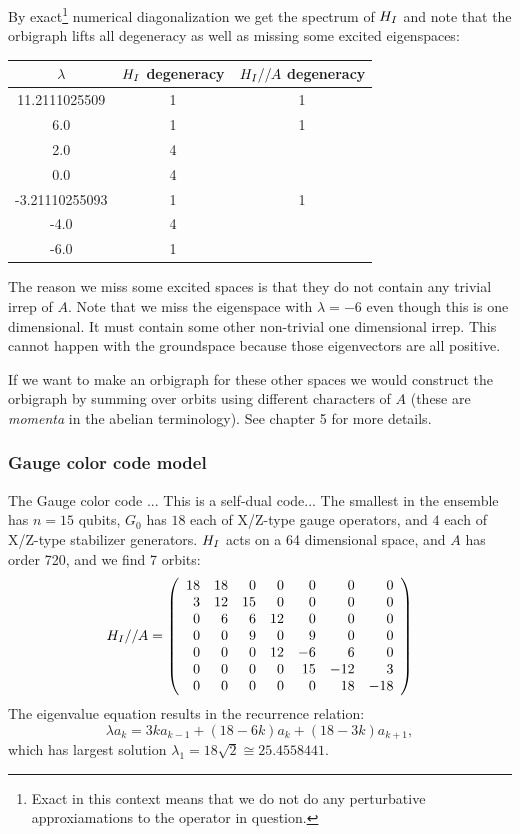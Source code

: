 \documentclass[12pt]{article}
\begin{document}
By exact\footnote{Exact in this context means that we do not do any
perturbative approxiamations to the operator in question.}
numerical diagonalization
we get the spectrum of $H_I$ and note that the orbigraph lifts
all degeneracy as well as missing some excited eigenspaces:
\begin{center}
\begin{tabular}{ c|c|c } 
$\lambda$ & $H_I$ degeneracy & $H_I//A$ degeneracy \\
\hline
    11.2111025509 & 1 & 1 \\
    6.0 & 1 & 1 \\
    2.0 & 4 &   \\
    0.0 & 4 &   \\
    -3.21110255093 & 1 & 1 \\
    -4.0 & 4 &   \\
    -6.0 & 1 &   
\end{tabular}
\end{center}
The reason we miss some excited spaces is that they do not contain
any trivial irrep of $A.$
Note that we miss the eigenspace with $\lambda = -6$
even though this is one dimensional. It must contain some other non-trivial
one dimensional irrep. This cannot happen with the groundspace because
those eigenvectors are all positive.

If we want to make an orbigraph for these other spaces we would construct
the orbigraph by
summing over orbits using different characters of $A$
(these are \emph{momenta} in the abelian terminology).
See \cite{Cvetkovic1980} chapter 5 for more details.

%
\subsubsection{Gauge color code model}
The Gauge color code \cite{Bombin2015,Bombin2015single}...
This is a self-dual code...
The smallest in the ensemble has $n=15$ qubits,
$G_0$ has $18$ each of X/Z-type gauge operators,
and $4$ each of X/Z-type stabilizer generators.
$H_I$ acts on a 64 dimensional space, and $A$ has
order 720, and we find 7 orbits:
$$
H_I//A = 
\left(\begin{array}{rrrrrrr}
18 & 18 &  0 &  0 &  0 &  0 &  0 \cr
  3 & 12 & 15 &  0 &  0 &  0 &  0 \cr
  0 &  6 &  6 & 12 &  0 &  0 &  0 \cr
  0 &  0 &  9 &  0 &  9 &  0 &  0 \cr
  0 &  0 &  0 & 12 & -6 &  6 &  0 \cr
  0 &  0 &  0 &  0 & 15 & -12 &  3 \cr
  0 &  0 &  0 &  0 &  0 & 18 & -18
\end{array}\right)
$$
The eigenvalue equation results in
the recurrence relation:
$$
    \lambda a_k = 3ka_{k-1} + (18-6k)a_k + (18-3k)a_{k+1},
$$
which has largest solution 
$\lambda_1 = 18\sqrt{2} \cong 25.4558441.$
\end{document}
